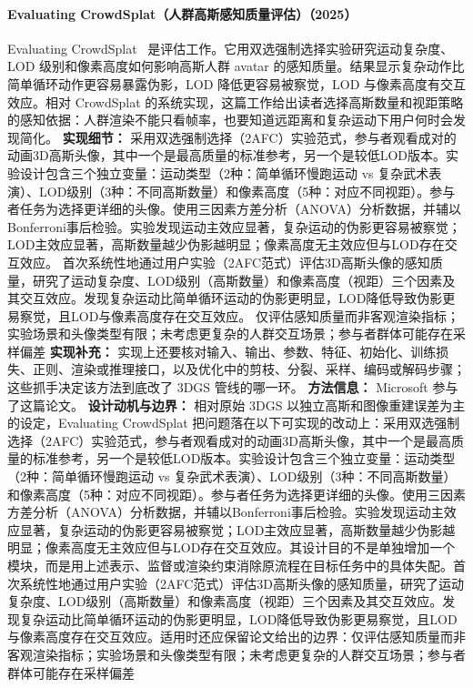 \paragraph{Evaluating CrowdSplat（人群高斯感知质量评估）（2025）}
Evaluating CrowdSplat~\cite{2501_17085} 是评估工作。它用双选强制选择实验研究运动复杂度、LOD 级别和像素高度如何影响高斯人群 avatar 的感知质量。结果显示复杂动作比简单循环动作更容易暴露伪影，LOD 降低更容易被察觉，LOD 与像素高度有交互效应。相对 CrowdSplat 的系统实现，这篇工作给出读者选择高斯数量和视距策略的感知依据：人群渲染不能只看帧率，也要知道远距离和复杂运动下用户何时会发现简化。
\textbf{实现细节：} 采用双选强制选择（2AFC）实验范式，参与者观看成对的动画3D高斯头像，其中一个是最高质量的标准参考，另一个是较低LOD版本。实验设计包含三个独立变量：运动类型（2种：简单循环慢跑运动 vs 复杂武术表演）、LOD级别（3种：不同高斯数量）和像素高度（5种：对应不同视距）。参与者任务为选择更详细的头像。使用三因素方差分析（ANOVA）分析数据，并辅以Bonferroni事后检验。实验发现运动主效应显著，复杂运动的伪影更容易被察觉；LOD主效应显著，高斯数量越少伪影越明显；像素高度无主效应但与LOD存在交互效应。 首次系统性地通过用户实验（2AFC范式）评估3D高斯头像的感知质量，研究了运动复杂度、LOD级别（高斯数量）和像素高度（视距）三个因素及其交互效应。发现复杂运动比简单循环运动的伪影更明显，LOD降低导致伪影更易察觉，且LOD与像素高度存在交互效应。 仅评估感知质量而非客观渲染指标；实验场景和头像类型有限；未考虑更复杂的人群交互场景；参与者群体可能存在采样偏差
\textbf{实现补充：} 实现上还要核对输入、输出、参数、特征、初始化、训练损失、正则、渲染或推理接口，以及优化中的剪枝、分裂、采样、编码或解码步骤；这些抓手决定该方法到底改了 3DGS 管线的哪一环。
\textbf{方法信息：} Microsoft 参与了这篇论文。
\textbf{设计动机与边界：} 相对原始 3DGS 以独立高斯和图像重建误差为主的设定，Evaluating CrowdSplat 把问题落在以下可实现的改动上：采用双选强制选择（2AFC）实验范式，参与者观看成对的动画3D高斯头像，其中一个是最高质量的标准参考，另一个是较低LOD版本。实验设计包含三个独立变量：运动类型（2种：简单循环慢跑运动 vs 复杂武术表演）、LOD级别（3种：不同高斯数量）和像素高度（5种：对应不同视距）。参与者任务为选择更详细的头像。使用三因素方差分析（ANOVA）分析数据，并辅以Bonferroni事后检验。实验发现运动主效应显著，复杂运动的伪影更容易被察觉；LOD主效应显著，高斯数量越少伪影越明显；像素高度无主效应但与LOD存在交互效应。其设计目的不是单独增加一个模块，而是用上述表示、监督或渲染约束消除原流程在目标任务中的具体失配。首次系统性地通过用户实验（2AFC范式）评估3D高斯头像的感知质量，研究了运动复杂度、LOD级别（高斯数量）和像素高度（视距）三个因素及其交互效应。发现复杂运动比简单循环运动的伪影更明显，LOD降低导致伪影更易察觉，且LOD与像素高度存在交互效应。适用时还应保留论文给出的边界：仅评估感知质量而非客观渲染指标；实验场景和头像类型有限；未考虑更复杂的人群交互场景；参与者群体可能存在采样偏差
